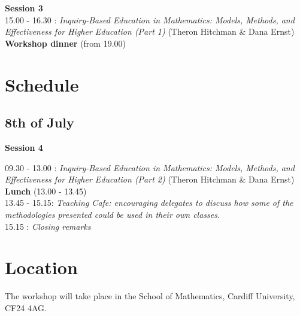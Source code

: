 \documentclass {leaflet}
\begin{document}
\textbf{Session 3}\\

15.00 - 16.30 : \textit{Inquiry-Based Education in Mathematics: Models, Methods, and Effectiveness for Higher Education (Part 1)} (Theron Hitchman \& Dana Ernst)\\

\textbf{Workshop dinner} (from 19.00)

\newpage
\section{Schedule}
\subsection{8th of July}
\vspace{1cm}

\textbf{Session 4}

09.30 - 13.00 : \textit{Inquiry-Based Education in Mathematics: Models, Methods, and Effectiveness for Higher Education (Part 2)} (Theron Hitchman \& Dana Ernst)\\

\textbf{Lunch} (13.00 - 13.45)\\

13.45 - 15.15: \textit{Teaching Cafe: encouraging delegates to discuss how some of the methodologies presented could be used in their own classes.}\\

15.15 : \textit{Closing remarks}

\newpage
\section{Location}
\vspace{1cm}

The workshop will take place in the School of Mathematics, Cardiff University, CF24 4AG.\\

\vspace{1cm}
\end{document}
